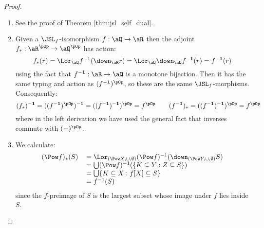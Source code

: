 \documentclass{article}
\begin{document}
\begin{proof}
\item
\begin{enumerate}
\item
See the proof of Theorem \ref{thm:jsl_self_dual}.

\item
Given a $\JSL_f$-isomorphism $f : \aQ \to \aR$ then the adjoint $f_* : \aR^{\pOp} \to \aQ^{\pOp}$ has action:
\[
f_*(r) 
= \Lor_\aQ f^{-1}(\down_\aR r)
= \Lor_\aQ \down_\aQ f^{\bf-1}(r)
= f^{\bf-1}(r)
\]
using the fact that $f^{\bf-1} : \aR \to \aQ$ is a monotone bijection. Then it has the same typing and action as $(f^{\bf-1})^{\pOp}$, so these are the same $\JSL_f$-morphisms. Consequently:
\[
(f_*)^{\bf-1} 
= ((f^{\bf-1})^{\pOp})^{\bf-1}
= ((f^{\bf-1})^{\bf-1})^{\pOp}
= f^{\pOp}
\qquad
(f^{\bf-1})_*
= ((f^{\bf-1})^{\bf-1})^{\pOp}
= f^{\pOp}
\]
where in the left derivation we have used the general fact that inverses commute with $(-)^{\pOp}$.


\item
We calculate:
\[
\begin{tabular}{ll}
$(\Pow f)_* (S)$
&
$= \Lor_{(\Pow X,\cup,\emptyset)} (\Pow f)^{-1}(\down_{(\Pow Y,\cup,\emptyset)} S)$
\\&
$= \bigcup (\Pow f)^{-1}(\{ K \subseteq Y : Z \subseteq S\})$
\\&
$= \bigcup \{ K \subseteq X : f[X] \subseteq S \}$
\\&
$= f^{-1}(S)$
\end{tabular}
\]
since the $f$-preimage of $S$ is the largest subset whose image under $f$ lies inside $S$.


\end{enumerate}
\end{proof}
\end{document}
